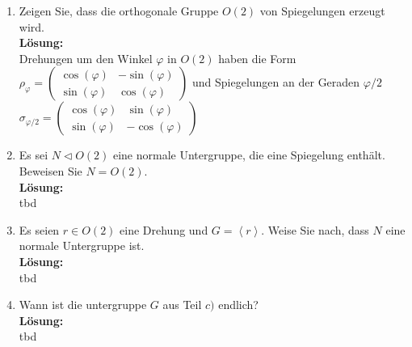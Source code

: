 \documentclass[11pt,a4paper,ngerman]{article}
\begin{document}
\begin{enumerate}[\bfseries a)]
\item Zeigen Sie, dass die orthogonale Gruppe $O(2)$ von Spiegelungen erzeugt wird.\\

\textbf{Lösung:}\\

Drehungen um den Winkel $\varphi$  in $O(2)$ haben die Form \\$\rho_{\varphi} = \begin{pmatrix} \cos (\varphi) & - \sin (\varphi) \\ \sin (\varphi) & \cos (\varphi) \end{pmatrix}$ und Spiegelungen an der Geraden $\varphi / 2 $ \\$\sigma_{\varphi / 2} = \begin{pmatrix} \cos (\varphi) & \sin (\varphi ) \\ \sin (\varphi ) & - \cos ( \varphi ) \end{pmatrix}$

\item Es sei $N \vartriangleleft O(2)$ eine normale Untergruppe, die eine Spiegelung enthält. Beweisen Sie $N = O(2)$.\\

\textbf{Lösung:}\\

tbd

\item Es seien $r \in O(2)$ eine Drehung und $G = \left< r \right>$. Weise Sie nach, dass $N$ eine normale Untergruppe ist.\\

\textbf{Lösung:}\\

tbd

\item Wann ist die untergruppe $G$ aus Teil $c)$ endlich?\\

\textbf{Lösung:}\\

tbd

\end{enumerate}
\end{document}
